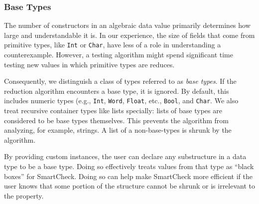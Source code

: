 \documentclass[10pt]{sigplanconf}
\newenvironment{code}{\begin{alltt}}{\end{alltt}}
\newcommand{\ttp}[1]{\texttt{#1}}
\begin{document}


\subsubsection{Base Types}\label{sec:base}

The number of constructors in an algebraic data value primarily determines how
large and understandable it is.  In our experience, the size of fields that come
from primitive types, like \ttp{Int} or \ttp{Char}, have less of a role in
understanding a counterexample.  However, a testing algorithm might spend
significant time testing new values in which primitive types are reduces.

Consequently, we distinguish a class of types referred to as \emph{base types}.
If the reduction algorithm encounters a base type, it is ignored.  By default,
this includes numeric types (e.g., \ttp{Int}, \ttp{Word}, \ttp{Float}, etc.,
\ttp{Bool}, and \ttp{Char}.  We also treat recursive container types like lists
specially: lists of base types are considered to be base types themselves.  This
prevents the algorithm from analyzing, for example, strings.  A list of a
non-base-types is shrunk by the algorithm.

By providing custom instances, the user can declare any substructure in a data
type to be a base type.  Doing so effectively treats values from that type as
``black boxes'' for SmartCheck.  Doing so can help make SmartCheck more
efficient if the user knows that some portion of the structure cannot be shrunk
or is irrelevant to the property.
\end{document}
